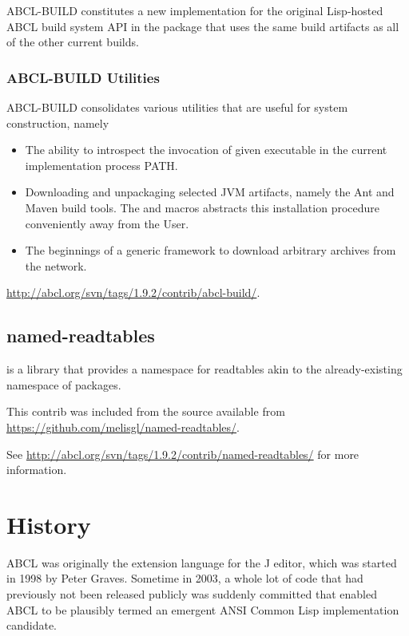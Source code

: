 \documentclass[10pt]{book}
\begin{document}
\textsc{ABCL-BUILD} constitutes a new implementation for the original
Lisp-hosted \textsc{ABCL} build system API in the package
 that uses the same build artifacts as all of the
other current builds.

\subsection{ABCL-BUILD Utilities}

\textsc{ABCL-BUILD} consolidates various utilities that are useful
for system construction, namely

\begin{itemize}

\item The ability to introspect the invocation of given executable in
  the current implementation process PATH.

\item Downloading and unpackaging selected JVM artifacts, namely the
  Ant and Maven build tools.  The  and
   macros abstracts this installation
  procedure conveniently away from the User.

\item The beginnings of a generic framework to download arbitrary
    archives from the network.
\end{itemize}

\url{http://abcl.org/svn/tags/1.9.2/contrib/abcl-build/}.

\section{named-readtables}
\label{section:named-readtables}

 is a library that provides a namespace for
readtables akin to the already-existing namespace of packages.

This contrib was included from the source available from
\url{https://github.com/melisgl/named-readtables/}.

See \url{http://abcl.org/svn/tags/1.9.2/contrib/named-readtables/} for
more information.

\chapter{History}

\textsc{ABCL} was originally the extension language for the J editor, which was
started in 1998 by Peter Graves.  Sometime in 2003, a whole lot of
code that had previously not been released publicly was suddenly
committed that enabled ABCL to be plausibly termed an emergent ANSI
Common Lisp implementation candidate.
\end{document}
